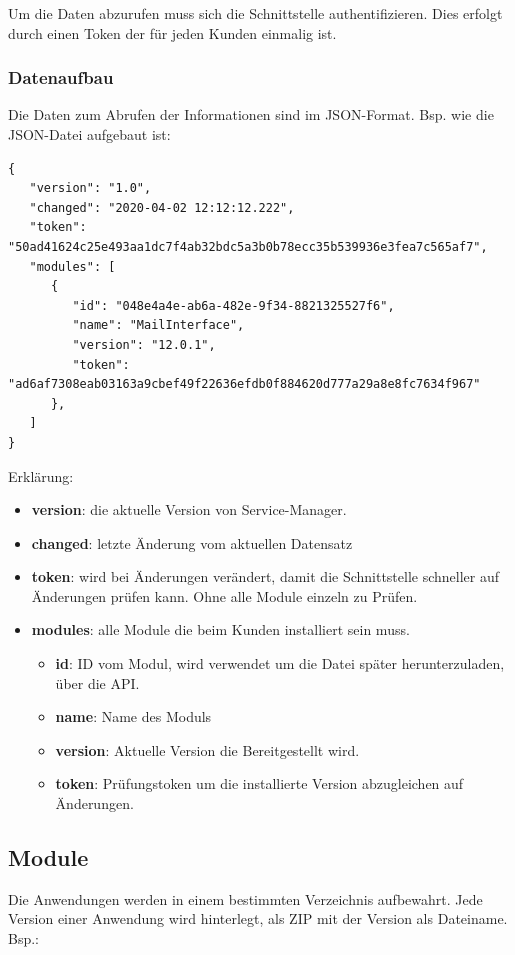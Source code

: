 \documentclass{article}
\begin{document}
Um die Daten abzurufen muss sich die Schnittstelle authentifizieren. Dies erfolgt durch einen Token der für jeden Kunden einmalig ist.

\subsubsection{Datenaufbau}

Die Daten zum Abrufen der Informationen sind im JSON-Format. 
Bsp. wie die JSON-Datei aufgebaut ist:
\begin{verbatim}
{
   "version": "1.0",
   "changed": "2020-04-02 12:12:12.222",
   "token": "50ad41624c25e493aa1dc7f4ab32bdc5a3b0b78ecc35b539936e3fea7c565af7",
   "modules": [
      {
         "id": "048e4a4e-ab6a-482e-9f34-8821325527f6",
         "name": "MailInterface",
         "version": "12.0.1",
         "token": "ad6af7308eab03163a9cbef49f22636efdb0f884620d777a29a8e8fc7634f967"
      },
   ]
}
\end{verbatim}

Erklärung: 

\begin{itemize}
  \item \textbf{version}: die aktuelle Version von Service-Manager.
  \item \textbf{changed}: letzte Änderung vom aktuellen Datensatz
  \item \textbf{token}: wird bei Änderungen verändert, damit die Schnittstelle schneller auf Änderungen prüfen kann. Ohne alle Module einzeln zu Prüfen.
  \item \textbf{modules}: alle Module die beim Kunden installiert sein muss.
  \begin{itemize}
  	\item \textbf{id}: ID vom Modul, wird verwendet um die Datei später herunterzuladen, über die API.
  	\item \textbf{name}: Name des Moduls
  	\item \textbf{version}: Aktuelle Version die Bereitgestellt wird.
  	\item \textbf{token}: Prüfungstoken um die installierte Version abzugleichen auf Änderungen.
  \end{itemize}
\end{itemize}

\subsection{Module}

Die Anwendungen werden in einem bestimmten Verzeichnis aufbewahrt. Jede Version einer Anwendung wird hinterlegt, als ZIP mit der Version als Dateiname.
Bsp.: 
\end{document}
